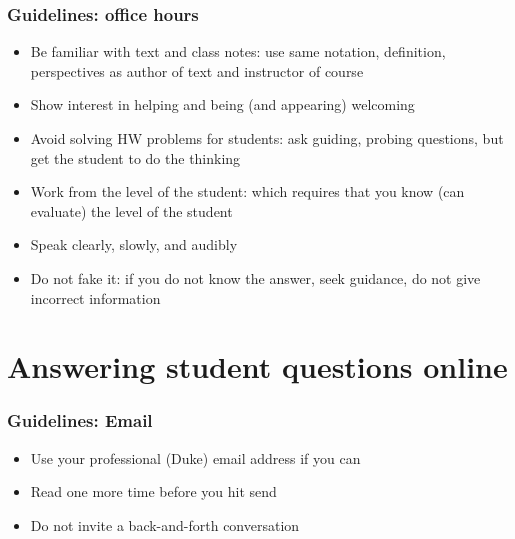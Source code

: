 \documentclass{beamer}
\begin{document}
\begin{frame}
\frametitle{Guidelines: office hours}

\begin{itemize}[<+->]

\item Be familiar with text and class notes: use same notation, definition, perspectives as author of text and instructor of course

\item Show interest in helping and being (and appearing) welcoming

\item Avoid solving HW problems for students: ask guiding, probing questions, but get the student to do the thinking

\item Work from the level of the student: which requires that you know (can evaluate) the level of the student

\item Speak clearly, slowly, and audibly

\item Do not fake it: if you do not know the answer, seek guidance, do not give incorrect information

\end{itemize}

\end{frame}


\section{Answering student questions online}


\begin{frame}
\frametitle{Guidelines: Email}

\begin{itemize}[<+->]

\item Use your professional (Duke) email address if you can

\item Read one more time before you hit send

\item Do not invite a back-and-forth conversation

\end{itemize}

\end{frame}
\end{document}
